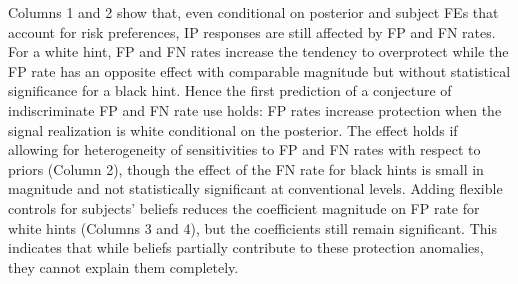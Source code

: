 \documentclass[12pt,a4paper]{article}
\begin{document}
Columns 1 and 2 show that, even conditional on posterior and subject FEs that account for risk preferences, IP responses are still affected by FP and FN rates. For a white hint, FP and FN rates increase the tendency to overprotect while the FP rate has an opposite effect with comparable magnitude but without statistical significance for a black hint. Hence the first prediction of a conjecture of indiscriminate FP and FN rate use holds: FP rates increase protection when the signal realization is white conditional on the posterior. The effect holds if allowing for heterogeneity of sensitivities to FP and FN rates with respect to priors (Column 2), though the effect of the FN rate for black hints is small in magnitude and not statistically significant at conventional levels. Adding flexible controls for subjects' beliefs reduces the coefficient magnitude on FP rate for white hints (Columns 3 and 4), but the coefficients still remain significant. This indicates that while beliefs partially contribute to these protection anomalies, they cannot explain them completely.


\begin{table}[htbp]\centering 
\caption{Informed Protection Response} 
\label{tab:protectReg}
\end{table}
\end{document}
